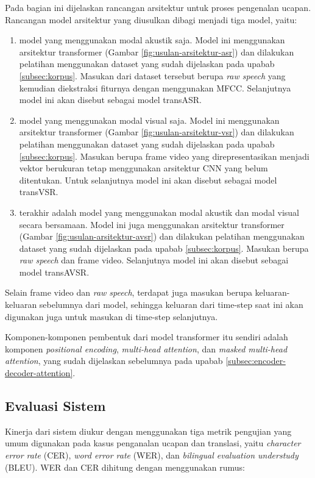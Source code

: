 Pada bagian ini dijelaskan rancangan arsitektur untuk proses pengenalan ucapan. Rancangan model arsitektur yang diusulkan dibagi menjadi tiga model, yaitu:
\begin{enumerate}
    \item model yang menggunakan modal akustik saja. Model ini menggunakan arsitektur transformer (Gambar \ref{fig:usulan-arsitektur-asr}) dan dilakukan pelatihan menggunakan dataset yang sudah dijelaskan pada upabab \ref{subsec:korpus}. Masukan dari dataset tersebut berupa \textit{raw speech} yang kemudian diekstraksi fiturnya dengan menggunakan MFCC. Selanjutnya model ini akan disebut sebagai model transASR.
    \item model yang menggunakan modal visual saja. Model ini menggunakan arsitektur transformer (Gambar \ref{fig:usulan-arsitektur-vsr}) dan dilakukan pelatihan menggunakan dataset yang sudah dijelaskan pada upabab \ref{subsec:korpus}. Masukan berupa frame video yang direpresentasikan menjadi vektor berukuran tetap menggunakan arsitektur CNN yang belum ditentukan. Untuk selanjutnya model ini akan disebut sebagai model transVSR.
    \item terakhir adalah model yang menggunakan modal akustik dan modal visual secara bersamaan. Model ini juga menggunakan arsitektur transformer (Gambar \ref{fig:usulan-arsitektur-avsr}) dan dilakukan pelatihan menggunakan dataset yang sudah dijelaskan pada upabab \ref{subsec:korpus}. Masukan berupa \textit{raw speech} dan frame video. Selanjutnya model ini akan disebut sebagai model transAVSR.
\end{enumerate}

Selain frame video dan \textit{raw speech}, terdapat juga masukan berupa keluaran-keluaran sebelumnya dari model, sehingga keluaran dari time-step saat ini akan digunakan juga untuk masukan di time-step selanjutnya.
\bigskip

Komponen-komponen pembentuk dari model transformer itu sendiri adalah komponen \textit{positional encoding}, \textit{multi-head attention}, dan \textit{masked multi-head attention}, yang sudah dijelaskan sebelumnya pada upabab \ref{subsec:encoder-decoder-attention}.

\subsection{Evaluasi Sistem}

Kinerja dari sistem diukur dengan menggunakan tiga metrik pengujian yang umum digunakan pada kasus penganalan ucapan dan translasi, yaitu \textit{character error rate} (CER), \textit{word error rate} (WER), dan \textit{bilingual evaluation understudy} (BLEU). WER dan CER dihitung dengan menggunakan rumus:

